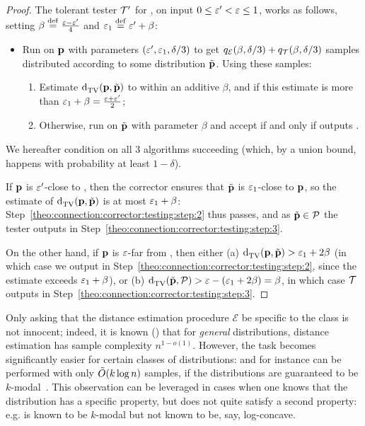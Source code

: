 \begin{proof}
The tolerant tester $\mathcal{T}^\prime$ for \property, on input $0 \leq \varepsilon^\prime < \varepsilon \leq 1$, works as follows, setting $\beta\stackrel{\rm def}{=}\frac{\varepsilon-\varepsilon^\prime}{4}$ and $\varepsilon_1\stackrel{\rm def}{=} \varepsilon^\prime+\beta$:
\begin{itemize}[-]
  \item\label{theo:connection:corrector:testing:step:1} Run \Algo on $\mathbf{p}$ with parameters $(\varepsilon^\prime,\varepsilon_1,\delta/3)$ to get $q_{\mathcal{E}}(\beta,\delta/3)+q_\mathcal{T}(\beta,\delta/3)$ samples distributed according to some distribution $\tilde{\mathbf{p}}$. Using these samples:
    \begin{enumerate}
        \item\label{theo:connection:corrector:testing:step:2} Estimate ${\operatorname{d}_{\rm{TV}}^{}\!\left({\mathbf{p}, \tilde{\mathbf{p}}}\right)}$ to within an additive $\beta$, and \reject if this estimate is more than $\varepsilon_1+\beta=\frac{\varepsilon+\varepsilon^\prime}{2}$;
        \item\label{theo:connection:corrector:testing:step:3} Otherwise, run \Tester on $\tilde{\mathbf{p}}$ with parameter $\beta$ and accept if and only if \Tester outputs \accept.
    \end{enumerate}
\end{itemize}

We hereafter condition on all 3 algorithms succeeding (which, by a union bound, happens with probability at least $1-\delta$).

\noindent If $\mathbf{p}$ is $\varepsilon^\prime$-close to \property, then the corrector ensures that $\tilde{\mathbf{p}}$ is $\varepsilon_1$-close to $\mathbf{p}$, so the estimate of ${\operatorname{d}_{\rm{TV}}^{}\!\left({\mathbf{p}, \tilde{\mathbf{p}}}\right)}$ is at most $\varepsilon_1+\beta$: Step~\ref{theo:connection:corrector:testing:step:2} thus passes, and as $\tilde{\mathbf{p}}\in\mathcal{P}$ the tester outputs \accept in Step~\ref{theo:connection:corrector:testing:step:3}.\medskip

\noindent On the other hand, if $\mathbf{p}$ is $\varepsilon$-far from \property, then either \textsf{(a)} ${\operatorname{d}_{\rm{TV}}^{}\!\left({\mathbf{p}, \tilde{\mathbf{p}}}\right)} > \varepsilon_1+2\beta$ (in which case we output \reject in Step~\ref{theo:connection:corrector:testing:step:2}, since the estimate exceeds $\varepsilon_1+\beta$), or \textsf{(b)} ${\operatorname{d}_{\rm{TV}}^{}\!\left({\tilde{\mathbf{p}}, \mathcal{P}}\right)} > \varepsilon - (\varepsilon_1+2\beta) = \beta$, in which case $\mathcal{T}$ outputs \reject in Step~\ref{theo:connection:corrector:testing:step:3}.
\end{proof}

\begin{remark}\label{remark:distance:estimation}
Only asking that the distance estimation procedure $\mathcal{E}$ be specific to the class \class is not innocent; indeed, it is known (\cite{VV:11:stoc}) that for \emph{general} distributions, distance estimation has sample complexity $n^{1-o(1)}$. However, the task becomes significantly easier for certain classes of distributions: and for instance can be performed with only $\tildeO{k\log n}$ samples, if the distributions are guaranteed to be $k$-modal~\cite{DDSVV:13}. This observation can be leveraged in cases
when one knows that the distribution has a specific property, but does not quite satisfy a second property: e.g. is known to be $k$-modal but not known to be, say, log-concave.
\end{remark}

